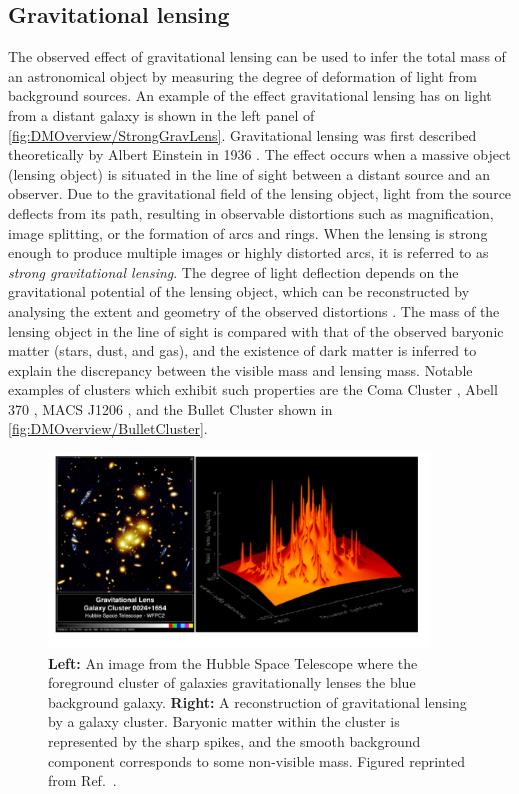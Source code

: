 \subsection{Gravitational lensing}\label{sec:DMOverview/GravLens}
The observed effect of gravitational lensing can be used to infer the total mass of an astronomical object by measuring the degree of deformation of light from background sources. An example of the effect gravitational lensing has on light from a distant galaxy is shown in the left panel of \autoref{fig:DMOverview/StrongGravLens}. Gravitational lensing was first described theoretically by Albert Einstein in 1936 \cite{GravLens}. The effect occurs when a massive object (lensing object) is situated in the line of sight between a distant source and an observer. Due to the gravitational field of the lensing object, light from the source deflects from its path, resulting in observable distortions such as magnification, image splitting, or the formation of arcs and rings.
When the lensing is strong enough to produce multiple images or highly distorted arcs, it is referred to as \textit{strong gravitational lensing}.
The degree of light deflection depends on the gravitational potential of the lensing object, which can be reconstructed by analysing the extent and geometry of the observed distortions \cite{Young2016}. 
The mass of the lensing object in the line of sight is compared with that of the observed baryonic matter (stars, dust, and gas), and the existence of dark matter is inferred to explain the discrepancy between the visible mass and lensing mass. 
Notable examples of clusters which exhibit such properties are the Coma Cluster \cite{Briel:1997hz}, Abell 370 \cite{Natarajan:2024iqm}, MACS J1206 \cite{GravLensPicture}, and the Bullet Cluster \cite{Clowe2006} shown in \autoref{fig:DMOverview/BulletCluster}.

\begin{figure}[h!]
	\centering
	\includegraphics[width=0.9\textwidth]{figures/DMOverview/Strong_Grav_lens.png}
	\caption[Effects of gravitational lensing on multiple galaxies alongside the reconstruction of gravitational lensing effects.]{\textbf{Left:} An image from the Hubble Space Telescope where the foreground cluster of galaxies gravitationally lenses the blue background galaxy. \textbf{Right:} A reconstruction of gravitational lensing by a galaxy cluster. Baryonic matter within the cluster is represented by the sharp spikes, and the smooth background component corresponds to some non-visible mass. Figured reprinted from Ref.~\cite{Freese2009}.}
	\label{fig:DMOverview/StrongGravLens}
\end{figure}
